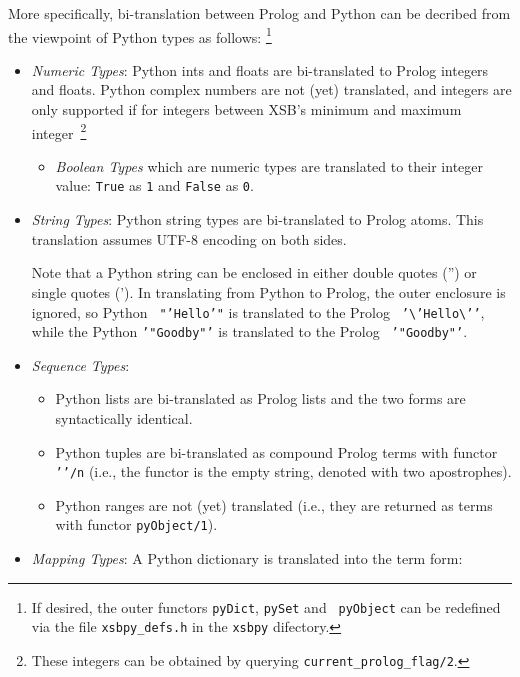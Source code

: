 \begin{description}
More specifically, bi-translation between Prolog and Python can be
decribed from the viewpoint of Python types as follows: \footnote{If
  desired, the outer functors {\tt pyDict}, {\tt pySet} and {\tt
    pyObject} can be redefined via the file {\tt xsbpy\_defs.h} in the
  {\tt xsbpy} difectory.}

\begin{itemize}
       \item {\em Numeric Types}: Python ints and floats are
         bi-translated to Prolog integers and floats.  Python complex
         numbers are not (yet) translated, and integers are only
         supported if for integers between XSB's minimum and maximum
         integer~\footnote{These integers can be obtained by querying
           {\tt current\_prolog\_flag/2}.}
         \begin{itemize}
           \item {\em Boolean Types} which are numeric types are
             translated to their integer value: {\tt True} as {\tt 1}
             and {\tt False} as {\tt 0}.
         \end{itemize}
       \item {\em String Types}: Python string types are bi-translated
         to Prolog atoms.  This translation assumes UTF-8 encoding on
         both sides.

         Note that a Python string can be enclosed in either double
         quotes ('') or single quotes (').  In translating from Python
         to Prolog, the outer enclosure is ignored, so Python {\tt
           "'Hello'"} is translated to the Prolog {\tt
           '\textbackslash{}'Hello\textbackslash{}'{}'}, while the
         Python {\tt '"Goodby"'} is translated to the Prolog {\tt
           '"Goodby"'}.
       \item {\em Sequence Types}:
         \begin{itemize}
           \item Python lists are bi-translated as Prolog lists and
             the two forms are syntactically identical.
           \item Python tuples are bi-translated as compound Prolog
             terms with functor {\tt '{}'/n} (i.e., the functor is the
             empty string, denoted with two apostrophes).
             \item Python ranges are not (yet) translated (i.e., they
               are returned as terms with functor {\tt pyObject/1}).
         \end{itemize}
       \item {\em Mapping Types}: A Python dictionary is translated
         into the term form:


\end{itemize}
\end{description}
